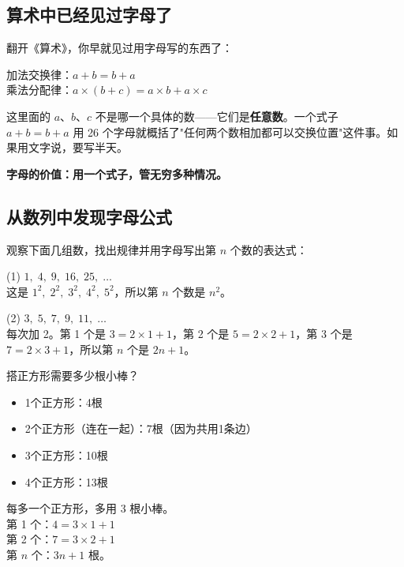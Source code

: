 

\subsection*{算术中已经见过字母了}

翻开《算术》，你早就见过用字母写的东西了：

加法交换律：$a+b=b+a$\\
乘法分配律：$a\times(b+c)=a\times b+a\times c$

这里面的 $a$、$b$、$c$ 不是哪一个具体的数——它们是\textbf{任意数}。一个式子 $a+b=b+a$ 用 26 个字母就概括了"任何两个数相加都可以交换位置"这件事。如果用文字说，要写半天。

\textbf{字母的价值：用一个式子，管无穷多种情况。}

\subsection*{从数列中发现字母公式}

\begin{example}
观察下面几组数，找出规律并用字母写出第 $n$ 个数的表达式：
\end{example}
\begin{solution}
(1) $1,\;4,\;9,\;16,\;25,\;\ldots$\\
这是 $1^2,\;2^2,\;3^2,\;4^2,\;5^2$，所以第 $n$ 个数是 $n^2$。

(2) $3,\;5,\;7,\;9,\;11,\;\ldots$\\
每次加 2。第 1 个是 $3=2\times1+1$，第 2 个是 $5=2\times2+1$，第 3 个是 $7=2\times3+1$，所以第 $n$ 个是 $2n+1$。
\end{solution}

\begin{example}
搭正方形需要多少根小棒？
\end{example}
\begin{solution}
\begin{itemize}
  \item 1个正方形：4根
  \item 2个正方形（连在一起）：7根（因为共用1条边）
  \item 3个正方形：10根
  \item 4个正方形：13根
\end{itemize}
每多一个正方形，多用 3 根小棒。\\
第 1 个：$4 = 3\times1+1$\\
第 2 个：$7 = 3\times2+1$\\
第 $n$ 个：$3n+1$ 根。
\end{solution}

